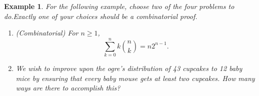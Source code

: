 \documentclass[11pt,titlepage]{article}		%
\newtheorem{example}[theorem]{Example}
\theoremstyle{definition}
\theoremstyle{theorem}
\begin{document}
\clearpage


\begin{example}
For the following example, choose two of the four problems to do.Exactly one of your choices should be a combinatorial proof.

\begin{enumerate}
    \item (Combinatorial) For $n\ge 1$,
    \[
        \sum\limits_{k=0}^n k \binom{n}{k} = n 2^{n-1}.
    \]
    
    \item We wish to improve upon the ogre's distribution of 43 cupcakes to 12 baby mice by ensuring that every baby mouse gets at least \textit{two} cupcakes. How many ways are there to accomplish this?
\end{enumerate}

\end{example}
\end{document}
